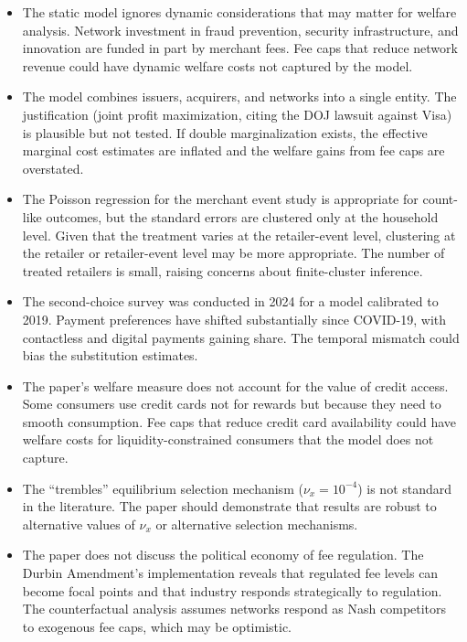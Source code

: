 \documentclass[11pt]{article}
\begin{document}
\begin{itemize}[leftmargin=*]
    \item The static model ignores dynamic considerations that may matter for welfare analysis. Network investment in fraud prevention, security infrastructure, and innovation are funded in part by merchant fees. Fee caps that reduce network revenue could have dynamic welfare costs not captured by the model.

    \item The model combines issuers, acquirers, and networks into a single entity. The justification (joint profit maximization, citing the DOJ lawsuit against Visa) is plausible but not tested. If double marginalization exists, the effective marginal cost estimates are inflated and the welfare gains from fee caps are overstated.

    \item The Poisson regression for the merchant event study is appropriate for count-like outcomes, but the standard errors are clustered only at the household level. Given that the treatment varies at the retailer-event level, clustering at the retailer or retailer-event level may be more appropriate. The number of treated retailers is small, raising concerns about finite-cluster inference.

    \item The second-choice survey was conducted in 2024 for a model calibrated to 2019. Payment preferences have shifted substantially since COVID-19, with contactless and digital payments gaining share. The temporal mismatch could bias the substitution estimates.

    \item The paper's welfare measure does not account for the value of credit access. Some consumers use credit cards not for rewards but because they need to smooth consumption. Fee caps that reduce credit card availability could have welfare costs for liquidity-constrained consumers that the model does not capture.

    \item The ``trembles'' equilibrium selection mechanism ($\nu_x = 10^{-4}$) is not standard in the literature. The paper should demonstrate that results are robust to alternative values of $\nu_x$ or alternative selection mechanisms.

    \item The paper does not discuss the political economy of fee regulation. The Durbin Amendment's implementation reveals that regulated fee levels can become focal points and that industry responds strategically to regulation. The counterfactual analysis assumes networks respond as Nash competitors to exogenous fee caps, which may be optimistic.
\end{itemize}
\end{document}
